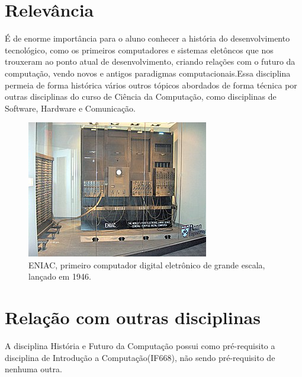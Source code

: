 \documentclass[a4paper, 12pt]{article}
\begin{document}
\section{Relevância}
É de enorme importância para o aluno conhecer a história do desenvolvimento tecnológico, como os primeiros computadores e sistemas eletôncos que nos trouxeram ao ponto atual de desenvolvimento, criando relações com o futuro da computação, vendo novos e antigos paradigmas computacionais.\newpage Essa disciplina permeia de forma histórica vários outros tópicos abordados de forma técnica por outras disciplinas do curso de Ciência da Computação, como disciplinas de Software, Hardware e Comunicação.
\begin{figure}[h!]
\centering
\includegraphics[scale=0.8]{eniac.jpg}
\caption{ENIAC, primeiro computador digital eletrônico de grande escala, lançado em 1946.\cite{eniac}}
\label{fig:eniac.jpg}
\end{figure}
\section{Relação com outras disciplinas}
A disciplina História e Futuro da Computação possui como pré-requisito a disciplina de Introdução a Computação(IF668), não sendo pré-requisito de nenhuma outra.




\end{document}
